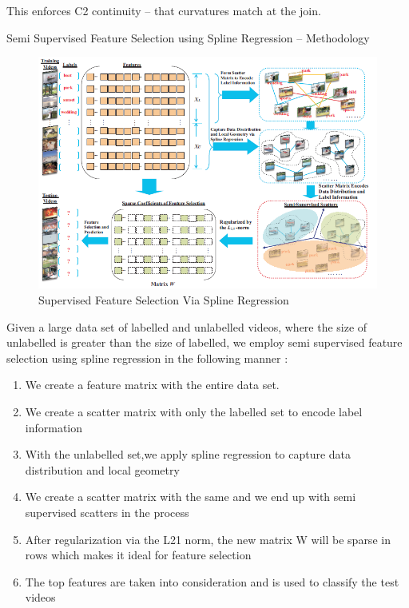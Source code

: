 \documentclass[a4paper,12pt]{article}
\begin{document}
\begin{enumerate}
\begin{enumerate}
This enforces C2 continuity – that curvatures match at the join.


\end{enumerate}

Semi Supervised Feature Selection using Spline Regression – Methodology
\begin{figure}

\includegraphics[width=1.0\textwidth]{./spline.jpg}
\caption{ Supervised Feature Selection Via Spline Regression }
\end{figure}

Given a large data set of labelled and unlabelled videos, where the size of unlabelled is greater than the size of labelled, we employ semi supervised feature selection using spline regression in the following manner :
\begin{enumerate}
\item We create a feature matrix with the entire data set.
\item We create a scatter matrix with only the labelled set to encode label information
\item With the unlabelled set,we apply spline regression to capture data distribution and local geometry
\item We create a scatter matrix with the same and we end up with semi supervised scatters in the process
\item After regularization via the L21 norm, the new matrix W will be sparse in rows which makes it ideal for feature selection
\item The top features are taken into consideration and is used to classify the test videos

\end{enumerate}


\end{enumerate}
\end{document}
